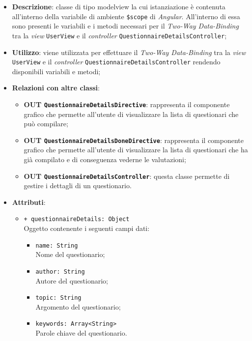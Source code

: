 	\begin{itemize}
		\item \textbf{Descrizione}: classe di tipo modelview la cui istanziazione è contenuta all'interno della variabile di ambiente \texttt{\$scope} di \textit{Angular}. All'interno di essa sono presenti le variabili e i metodi necessari per il \textit{Two-Way Data-Binding} tra la \textit{view} \texttt{UserView} e il \textit{controller} \texttt{QuestionnaireDetailsController};
		\item \textbf{Utilizzo}: viene utilizzata per effettuare il \textit{Two-Way Data-Binding} tra la \textit{view} \texttt{UserView} e il \textit{controller} \texttt{QuestionnaireDetailsController} rendendo disponibili variabili e metodi;
		\item \textbf{Relazioni con altre classi}: 
		\begin{itemize}
			\item \textbf{OUT \texttt{QuestionnaireDetailsDirective}}: rappresenta il componente grafico che permette all'utente di visualizzare la lista di questionari che può compilare;
			\item \textbf{OUT \texttt{QuestionnaireDetailsDoneDirective}}: rappresenta il componente grafico che permette all'utente di visualizzare la lista di questionari che ha già compilato e di conseguenza vederne le valutazioni;
			\item \textbf{OUT \texttt{QuestionnaireDetailsController}}: questa classe permette di gestire i dettagli di un questionario.
		\end{itemize}
		\item \textbf{Attributi}: 
		\begin{itemize}
			\item \texttt{+ questionnaireDetails: Object} \\ Oggetto contenente i seguenti campi dati:
			\begin{itemize}
				\item \texttt{name: String}\\ Nome del questionario;
				\item \texttt{author: String}\\ Autore del questionario;
				\item \texttt{topic: String}\\ Argomento del questionario;
				\item \texttt{keywords: Array<String>}\\ Parole chiave del questionario.
			\end{itemize}

\end{itemize}
\end{itemize}
